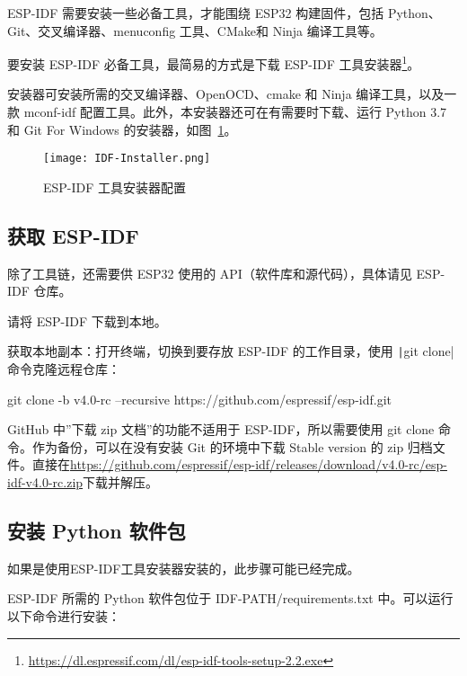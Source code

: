 ESP-IDF 需要安装一些必备工具，才能围绕 ESP32 构建固件，包括 Python、Git、交叉编译器、menuconfig 工具、CMake和 Ninja 编译工具等。

要安装 ESP-IDF 必备工具，最简易的方式是下载 ESP-IDF 工具安装器\footnote{\url{https://dl.espressif.com/dl/esp-idf-tools-setup-2.2.exe}}。

安装器可安装所需的交叉编译器、OpenOCD、cmake 和 Ninja 编译工具，以及一款 mconf-idf 配置工具。此外，本安装器还可在有需要时下载、运行 Python 3.7 和 Git For Windows 的安装器，如图~\ref{fig:IDF-Installer}。

\begin{figure}[htbp]
    \centering
    \texttt{[image: IDF-Installer.png]}
    \caption{ESP-IDF 工具安装器配置}
    \label{fig:IDF-Installer}
\end{figure}

\subsection{获取 ESP-IDF}

除了工具链，还需要供 ESP32 使用的 API（软件库和源代码），具体请见 ESP-IDF 仓库。

请将 ESP-IDF 下载到本地。

获取本地副本：打开终端，切换到要存放 ESP-IDF 的工作目录，使用 \texttt|git clone| 命令克隆远程仓库：

\begin{tcolorbox}
    git clone -b v4.0-rc --recursive https://github.com/espressif/esp-idf.git
\end{tcolorbox}

GitHub 中”下载 zip 文档”的功能不适用于 ESP-IDF，所以需要使用 git clone 命令。作为备份，可以在没有安装 Git 的环境中下载 Stable version 的 zip 归档文件。直接在\url{https://github.com/espressif/esp-idf/releases/download/v4.0-rc/esp-idf-v4.0-rc.zip}下载并解压。

\subsection{安装 Python 软件包}

如果是使用ESP-IDF工具安装器安装的，此步骤可能已经完成。

ESP-IDF 所需的 Python 软件包位于 IDF-PATH/requirements.txt 中。可以运行以下命令进行安装：


